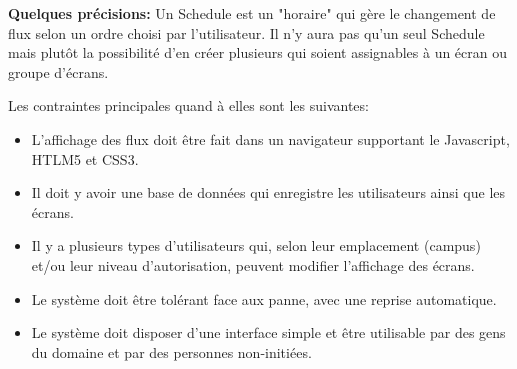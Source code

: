 \documentclass[french]{article}
\begin{document}
\textbf{Quelques précisions:}
Un Schedule est un "horaire" qui gère le changement de flux selon un ordre choisi par l'utilisateur. Il n'y aura pas qu'un seul Schedule mais plutôt la possibilité d'en créer plusieurs qui soient assignables à un écran ou groupe d'écrans.
\newline


Les contraintes principales quand à elles sont les suivantes:
\begin{itemize}
	\item L'affichage des flux doit être fait dans un navigateur supportant le Javascript, HTLM5 et CSS3.
	\item Il doit y avoir une base de données qui enregistre les utilisateurs ainsi que les écrans.
	\item Il y a plusieurs types d'utilisateurs qui, selon leur emplacement (campus) et/ou leur niveau d'autorisation, peuvent modifier l'affichage des écrans.
	\item Le système doit être tolérant face aux panne, avec une reprise automatique.
	\item Le système doit disposer d'une interface simple et être utilisable par des gens du domaine et par des personnes non-initiées.
\end{itemize}
\end{document}
